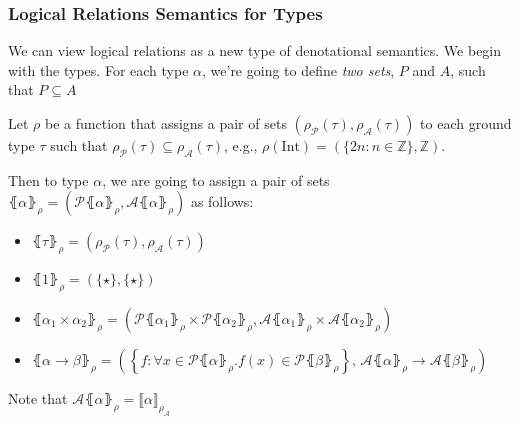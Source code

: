 \documentclass[aspectratio=169]{beamer}
\begin{document}
\begin{frame}
\frametitle{Logical Relations Semantics for Types}

We can view logical relations as a new type of denotational semantics.
We begin with the types.
For each type $\alpha$, we're going to define \emph{two sets}, $P$ and $A$, such that $P \subseteq A$

\pause
\medskip

Let $\rho$ be a function that assigns a pair of sets $\left(\rho_{\mathcal{P}}(\tau), \rho_{\mathcal{A}}(\tau)\right)$ to each ground type $\tau$ such that $\rho_{\mathcal{P}}(\tau) \subseteq \rho_{\mathcal{A}}(\tau)$, e.g., $\rho(\text{Int}) = \left(\{2n : n \in \mathbb{Z}\}, \mathbb{Z}\right)$.

\pause
\medskip

Then to type $\alpha$, we are going to assign a pair of sets $\lBrace \alpha \rBrace_{\rho} = \left(\mathcal{P}\lBrace \alpha \rBrace_{\rho}, \mathcal{A}\lBrace \alpha \rBrace_{\rho}\right)$ as follows:

\begin{itemize}
    \item $\lBrace \tau \rBrace_{\rho} = \left(\rho_{\mathcal{P}}(\tau), \rho_{\mathcal{A}}(\tau)\right)$
    \item $\lBrace 1 \rBrace_{\rho} = \left(\{\star\}, \{\star\}\right)$
    \item $\lBrace \alpha_1 \times \alpha_2 \rBrace_{\rho} = \left(\mathcal{P}\lBrace \alpha_1 \rBrace_{\rho} \times \mathcal{P}\lBrace \alpha_2 \rBrace_{\rho}, \mathcal{A}\lBrace \alpha_1 \rBrace_{\rho} \times \mathcal{A}\lBrace \alpha_2 \rBrace_{\rho}\right)$
    \item $\lBrace \alpha \rightarrow \beta \rBrace_{\rho} = \left(\left\{ f : \forall x \in \mathcal{P}\lBrace \alpha \rBrace_{\rho}. f(x) \in \mathcal{P}\lBrace \beta \rBrace_{\rho} \right\},\, \mathcal{A}\lBrace \alpha \rBrace_{\rho} \rightarrow \mathcal{A}\lBrace \beta \rBrace_{\rho}\right)$
\end{itemize}

Note that $\mathcal{A}\lBrace \alpha \rBrace_{\rho} = \llbracket\alpha \rrbracket_{\rho_{\mathcal{A}}}$ 

\end{frame}
\end{document}
